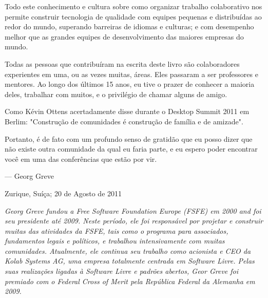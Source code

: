 Todo este conhecimento e cultura sobre como organizar trabalho colaborativo
nos permite construir tecnologia de qualidade com equipes pequenas e
distribuídas ao redor do mundo, superando barreiras de idiomas e culturas;
e com desempenho melhor que as grandes equipes de desenvolvimento das
maiores empresas do mundo.

Todas as pessoas que contribuíram na escrita deste livro são colaboradores
experientes em uma, ou as vezes muitas, áreas. Eles passaram a ser professores
e mentores. Ao longo dos últimos 15 anos, eu tive o prazer de conhecer a
maioria deles, trabalhar com muitos, e o privilégio de chamar alguns de
amigo.

Como Kévin Ottens acertadamente disse durante o Desktop Summit 2011 em
Berlim: "Construção de comunidades é construção de família e de amizade".

Portanto, é de fato com um profundo senso de gratidão que eu posso dizer
que não existe outra comunidade da qual eu faria parte, e eu espero
poder encontrar você em uma das conferências que estão por vir.
\newline
\begin{flushright}--- Georg Greve\end{flushright}
\begin{flushright}Zurique, Suíça; 20 de Agosto de 2011\end{flushright}

\textit{Georg Greve fundou a Free Software Foundation Europe (FSFE) em
2000 and foi seu presidente até 2009. Neste período, ele foi responsável
por projetar e construir muitas das atividades da FSFE, tais como o
programa para associados, fundamentos legais e políticos, e trabalhou
intensivamente com muitas comunidades. Atualmente, ele continua seu
trabalho como acionista e CEO da Kolab Systems AG, uma empresa totalmente
centrada em Software Livre. Pelas suas realizações ligadas
à Software Livre e padrões abertos, Geor Greve foi premiado com o
Federal Cross of Merit pela República Federal da Alemanha em 2009.}

\newpage
